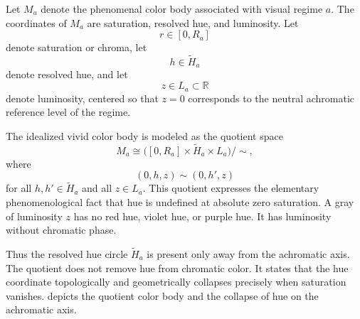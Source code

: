 \documentclass[preprint,12pt,authoryear]{elsarticle}
\theoremstyle{plain}
\theoremstyle{definition}
\theoremstyle{remark}
\begin{document}
Let $M_a$ denote the phenomenal color body associated with visual regime $a$. The coordinates of $M_a$ are saturation, resolved hue, and luminosity. Let
\[
r\in[0,R_a]
\]
denote saturation or chroma, let
\[
h\in\widetilde H_a
\]
denote resolved hue, and let
\[
z\in L_a\subset\mathbb{R}
\]
denote luminosity, centered so that $z=0$ corresponds to the neutral achromatic reference level of the regime.

The idealized vivid color body is modeled as the quotient space
\[
M_a\cong\bigl([0,R_a]\times\widetilde H_a\times L_a\bigr)/{\sim},
\]
where
\[
(0,h,z)\sim(0,h',z)
\]
for all $h,h'\in\widetilde H_a$ and all $z\in L_a$. This quotient expresses the elementary phenomenological fact that hue is undefined at absolute zero saturation. A gray of luminosity $z$ has no red hue, violet hue, or purple hue. It has luminosity without chromatic phase.

Thus the resolved hue circle $\widetilde H_a$ is present only away from the achromatic axis. The quotient does not remove hue from chromatic color. It states that the hue coordinate topologically and geometrically collapses precisely when saturation vanishes.  depicts the quotient color body and the collapse of hue
on the achromatic axis.
\end{document}
